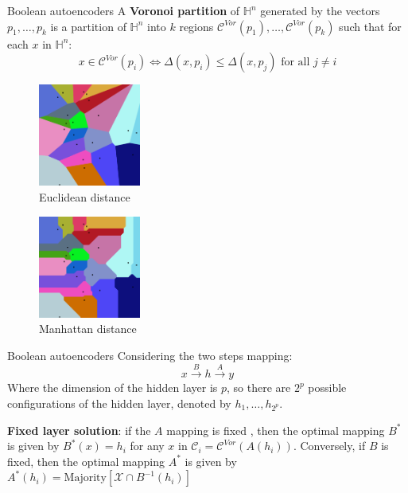 \documentclass[9pt]{beamer}
\begin{document}
\begin{frame}{Boolean autoencoders}
    A \textbf{Voronoi partition} of $\mathbb{H}^n$ generated by the vectors $p_1, \dots, p_k$ is a partition of $\mathbb{H}^n$ into $k$ regions $\mathcal{C}^{Vor}(p_1), \dots, \mathcal{C}^{Vor}(p_k)$ such that for each $x$ in $\mathbb{H}^n$:
\[
    x \in \mathcal{C}^{Vor}(p_i) \iff \Delta(x, p_i) \leq \Delta(x, p_j) \text{ for all } j \neq i    
\]
\begin{multicols}{2}
    \begin{center}
        \begin{figure}[H]
            \centering
            \includegraphics[width=0.3\textwidth]{./Images/Euclidean_Voronoi_diagram.png}
            \caption{Euclidean distance}
        \end{figure}
    \end{center}
    \begin{center}
        \begin{figure}[H]
            \centering
            \includegraphics[width=0.3\textwidth]{./Images/Manhattan_Voronoi_Diagram.png}
            \caption{Manhattan distance}
        \end{figure}
    \end{center}
\end{multicols}
\end{frame}


\begin{frame}{Boolean autoencoders}
Considering the two steps mapping:
\[
    x \xrightarrow{B} h \xrightarrow{A} y
\]
Where the dimension of the hidden layer is $p$, so there are $2^p$ possible configurations of the hidden layer, denoted by $h_1, \dots, h_{2^p}$.
\hspace{0.5cm}
\begin{theorem}
    \textbf{Fixed layer solution}: if the $A$ mapping is fixed , then the optimal mapping $B^*$ is given by $B^*(x) = h_i$ for any $x$ in $\mathcal{C}_i = \mathcal{C}^{Vor}(A(h_i))$. Conversely, if $B$ is fixed, then the optimal mapping $A^*$ is given by $A^*(h_i) = \text{Majority}\left[\mathcal{X} \cap B^{-1}(h_i)\right]$ 
\end{theorem}
\end{frame}
\end{document}
